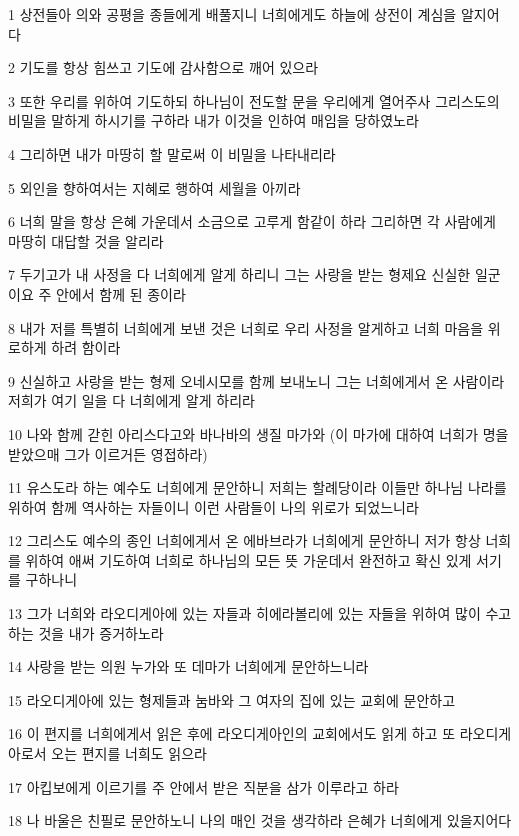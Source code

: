 \par 1 상전들아 의와 공평을 종들에게 배풀지니 너희에게도 하늘에 상전이 계심을 알지어다
\par 2 기도를 항상 힘쓰고 기도에 감사함으로 깨어 있으라
\par 3 또한 우리를 위하여 기도하되 하나님이 전도할 문을 우리에게 열어주사 그리스도의 비밀을 말하게 하시기를 구하라 내가 이것을 인하여 매임을 당하였노라
\par 4 그리하면 내가 마땅히 할 말로써 이 비밀을 나타내리라
\par 5 외인을 향하여서는 지혜로 행하여 세월을 아끼라
\par 6 너희 말을 항상 은혜 가운데서 소금으로 고루게 함같이 하라 그리하면 각 사람에게 마땅히 대답할 것을 알리라
\par 7 두기고가 내 사정을 다 너희에게 알게 하리니 그는 사랑을 받는 형제요 신실한 일군이요 주 안에서 함께 된 종이라
\par 8 내가 저를 특별히 너희에게 보낸 것은 너희로 우리 사정을 알게하고 너희 마음을 위로하게 하려 함이라
\par 9 신실하고 사랑을 받는 형제 오네시모를 함께 보내노니 그는 너희에게서 온 사람이라 저희가 여기 일을 다 너희에게 알게 하리라
\par 10 나와 함께 갇힌 아리스다고와 바나바의 생질 마가와 (이 마가에 대하여 너희가 명을 받았으매 그가 이르거든 영접하라)
\par 11 유스도라 하는 예수도 너희에게 문안하니 저희는 할례당이라 이들만 하나님 나라를 위하여 함께 역사하는 자들이니 이런 사람들이 나의 위로가 되었느니라
\par 12 그리스도 예수의 종인 너희에게서 온 에바브라가 너희에게 문안하니 저가 항상 너희를 위하여 애써 기도하여 너희로 하나님의 모든 뜻 가운데서 완전하고 확신 있게 서기를 구하나니
\par 13 그가 너희와 라오디게아에 있는 자들과 히에라볼리에 있는 자들을 위하여 많이 수고하는 것을 내가 증거하노라
\par 14 사랑을 받는 의원 누가와 또 데마가 너희에게 문안하느니라
\par 15 라오디게아에 있는 형제들과 눔바와 그 여자의 집에 있는 교회에 문안하고
\par 16 이 편지를 너희에게서 읽은 후에 라오디게아인의 교회에서도 읽게 하고 또 라오디게아로서 오는 편지를 너희도 읽으라
\par 17 아킵보에게 이르기를 주 안에서 받은 직분을 삼가 이루라고 하라
\par 18 나 바울은 친필로 문안하노니 나의 매인 것을 생각하라 은혜가 너희에게 있을지어다


